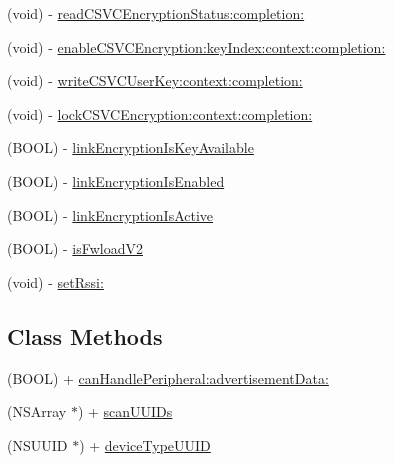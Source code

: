 \begin{DoxyCompactItemize}
\item 
(void) -\/ \hyperlink{interface_le_device_aa665b351477702a7ba79d914d211f9f5}{read\+C\+S\+V\+C\+Encryption\+Status\+:completion\+:}
\item 
(void) -\/ \hyperlink{interface_le_device_a709c312fe79544ea92c0da31f8fca696}{enable\+C\+S\+V\+C\+Encryption\+:key\+Index\+:context\+:completion\+:}
\item 
(void) -\/ \hyperlink{interface_le_device_a5ef96771cbbf58922326890970d3c41a}{write\+C\+S\+V\+C\+User\+Key\+:context\+:completion\+:}
\item 
(void) -\/ \hyperlink{interface_le_device_a016222df04b016d01a06ded22e96e7fa}{lock\+C\+S\+V\+C\+Encryption\+:context\+:completion\+:}
\item 
(B\+O\+O\+L) -\/ \hyperlink{interface_le_device_a7a42f1ff1068907ef58a403d1970c92b}{link\+Encryption\+Is\+Key\+Available}
\item 
(B\+O\+O\+L) -\/ \hyperlink{interface_le_device_a369fe5f2a33a90f296c5914693556405}{link\+Encryption\+Is\+Enabled}
\item 
(B\+O\+O\+L) -\/ \hyperlink{interface_le_device_a37b99d7bbc353f382e909d9d0551756c}{link\+Encryption\+Is\+Active}
\item 
(B\+O\+O\+L) -\/ \hyperlink{interface_le_device_a6a749e0b9e3bd6f48df3da28373397e5}{is\+Fwload\+V2}
\item 
(void) -\/ \hyperlink{interface_le_device_ae65731fce7d8c485231ea7d012b3e5e7}{set\+Rssi\+:}
\end{DoxyCompactItemize}
\subsection*{Class Methods}
\begin{DoxyCompactItemize}
\item 
(B\+O\+O\+L) + \hyperlink{interface_le_device_a9c8778c66b81d2b13643ba324ae7940f}{can\+Handle\+Peripheral\+:advertisement\+Data\+:}
\item 
(N\+S\+Array $\ast$) + \hyperlink{interface_le_device_a138401006375847b3eab465a9a6938d5}{scan\+U\+U\+I\+Ds}
\item 
(N\+S\+U\+U\+I\+D $\ast$) + \hyperlink{interface_le_device_a9e582ad4ef81fc332908939dca29dbdf}{device\+Type\+U\+U\+I\+D}
\end{DoxyCompactItemize}
